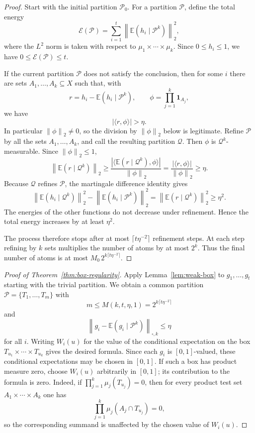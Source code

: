 \documentclass[11pt]{amsart}
\newcommand{\E}{\mathbb E}
\newcommand{\1}{\mathbf 1}
\newcommand{\norm}[1]{\left\lVert #1\right\rVert}
\newcommand{\abs}[1]{\left\lvert #1\right\rvert}
\begin{document}
\begin{proof}
Start with the initial partition $\mathcal P_0$.  For a partition $\mathcal P$, define the total energy
\[
        \mathcal E(\mathcal P)=\sum_{i=1}^t
        \norm{\E(h_i\mid\mathcal P^k)}_2^2,
\]
where the $L^2$ norm is taken with respect to $\mu_1\times\cdots\times\mu_k$.  Since $0\leq h_i\leq1$, we have $0\leq\mathcal E(\mathcal P)\leq t$.

If the current partition $\mathcal P$ does not satisfy the conclusion, then for some $i$ there are sets $A_1,\ldots,A_k\subseteq X$ such that, with
\[
        r=h_i-\E(h_i\mid\mathcal P^k),
        \qquad
        \phi=\prod_{j=1}^k\1_{A_j},
\]
we have
\[
        \abs{\langle r,\phi\rangle}>\eta .
\]
In particular $\norm{\phi}_2\ne0$, so the division by $\norm{\phi}_2$ below is legitimate.  Refine $\mathcal P$ by all the sets $A_1,\ldots,A_k$, and call the resulting partition $\mathcal Q$.  Then $\phi$ is $\mathcal Q^k$-measurable.  Since $\norm{\phi}_2\leq1$,
\[
        \norm{\E(r\mid\mathcal Q^k)}_2
        \geq
        \frac{\abs{\langle \E(r\mid\mathcal Q^k),\phi\rangle}}{\norm{\phi}_2}
        =
        \frac{\abs{\langle r,\phi\rangle}}{\norm{\phi}_2}
        \geq \eta .
\]
Because $\mathcal Q$ refines $\mathcal P$, the martingale difference identity gives
\[
        \norm{\E(h_i\mid\mathcal Q^k)}_2^2
        -
        \norm{\E(h_i\mid\mathcal P^k)}_2^2
        =
        \norm{\E(r\mid\mathcal Q^k)}_2^2
        \geq \eta^2 .
\]
The energies of the other functions do not decrease under refinement.  Hence the total energy increases by at least $\eta^2$.

The process therefore stops after at most $\lceil t\eta^{-2}\rceil$ refinement steps.  At each step refining by $k$ sets multiplies the number of atoms by at most $2^k$.  Thus the final number of atoms is at most $M_0\,2^{k\lceil t\eta^{-2}\rceil}$.
\end{proof}

\begin{proof}[Proof of Theorem~\ref{thm:box-regularity}]
Apply Lemma~\ref{lem:weak-box} to $g_1,\ldots,g_t$ starting with the trivial partition.  We obtain a common partition $\mathcal P=\{T_1,\ldots,T_m\}$ with
\[
        m\leq M(k,t,\eta,1)=2^{k\lceil t\eta^{-2}\rceil}
\]
and
\[
        \norm{g_i-\E(g_i\mid\mathcal P^k)}_{\square,k}\leq\eta
\]
for all $i$.  Writing $W_i(u)$ for the value of the conditional expectation on the box $T_{u_1}\times\cdots\times T_{u_k}$ gives the desired formula.  Since each $g_i$ is $[0,1]$-valued, these conditional expectations may be chosen in $[0,1]$.  If such a box has product measure zero, choose $W_i(u)$ arbitrarily in $[0,1]$; its contribution to the formula is zero.  Indeed, if $\prod_{j=1}^k\mu_j(T_{u_j})=0$, then for every product test set $A_1\times\cdots\times A_k$ one has
\[
        \prod_{j=1}^k\mu_j(A_j\cap T_{u_j})=0,
\]
so the corresponding summand is unaffected by the chosen value of $W_i(u)$.
\end{proof}
\end{document}
